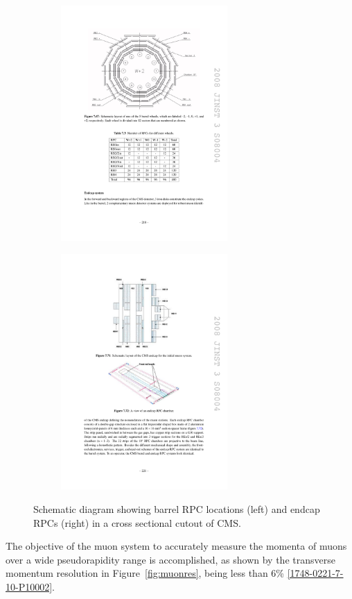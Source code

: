 \begin{figure}[tbh]
\centering
\begin{subfigure}{0.45\textwidth}
\centering
\includegraphics[width=2.5in]{figures/rpcbarrel.pdf}
\caption{}
\end{subfigure}
\begin{subfigure}{0.45\textwidth}
\centering
\includegraphics[width=2.5in]{figures/rpcendcap.pdf}
\caption{}
\end{subfigure}
\caption{Schematic diagram showing barrel RPC locations (left) and endcap RPCs (right) in a cross sectional cutout of CMS.}
\label{fig:rpcs}
\end{figure}

\indent The objective of the muon system to accurately measure the momenta of muons over a wide pseudorapidity range is accomplished, as shown by the transverse momentum resolution in Figure~\ref{fig:muonres}, being less than 6\% \ref{1748-0221-7-10-P10002}.

